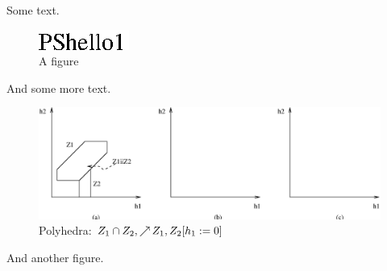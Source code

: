 \documentclass{article}
\begin{document}
Some text.
\begin{figure}
\begin{center}
\includegraphics{METHODS/test.eps}
\end{center}
\caption{A figure\label{fig:test}}
\end{figure}
And some more text.
\begin{figure}
\begin{center}
\includegraphics{METHODS/poly.eps}
\end{center}
\caption{Polyhedra: $Z_1 \cap Z_2, \mathop{\nearrow}{Z_1}, Z_2[h_1:=0]$}
\end{figure}
And another figure.
\end{document}
